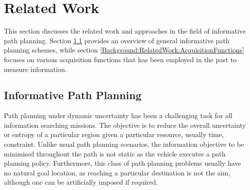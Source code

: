 %		
%		
		
	\section{Related Work}
	\label{Background:RelatedWork}
		
		This section discusses the related work and approaches in the field of informative path planning. Section \ref{Background:RelatedWork:InformativePathPlanning} provides an overview of general informative path planning schemes, while section \ref{Background:RelatedWork:AcquisitionFunctions} focuses on various acquisition functions that has been employed in the past to measure information.
				
		\subsection{Informative Path Planning}
		\label{Background:RelatedWork:InformativePathPlanning}
			
			Path planning under dynamic uncertainty has been a challenging task for all information searching missions. The objective is to reduce the overall uncertainty or entropy of a particular region given a particular resource, usually time, constraint. Unlike usual path planning scenarios, the information objective to be minimised throughout the path is not static as the vehicle executes a path planning policy. Furthermore, this class of path planning problems usually have no natural goal location, as reaching a particular destination is not the aim, although one can be artificially imposed if required.
		
